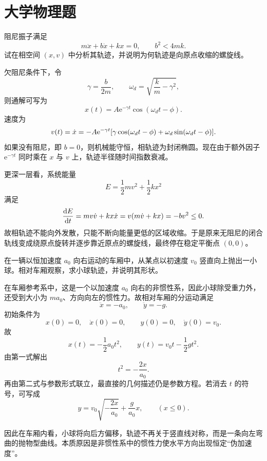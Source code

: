 \section*{大学物理题}

\begin{university}
阻尼振子满足
\[
m\ddot x+b\dot x+kx=0,
\qquad b^2<4mk.
\]
试在相空间 $(x,v)$ 中分析其轨迹，并说明为何轨迹是向原点收缩的螺旋线。

\begin{solution}
欠阻尼条件下，令
\[
\gamma=\frac{b}{2m},
\qquad
\omega_d=\sqrt{\frac{k}{m}-\gamma^2},
\]
则通解可写为
\[
x(t)=A\mathrm e^{-\gamma t}\cos(\omega_d t-\phi).
\]
速度为
\[
v(t)=\dot x=-A\mathrm e^{-\gamma t}\qty[\gamma\cos(\omega_d t-\phi)+\omega_d\sin(\omega_d t-\phi)].
\]
如果没有阻尼，即 $b=0$，则机械能守恒，相轨迹为封闭椭圆。现在由于额外因子 $\mathrm e^{-\gamma t}$ 同时乘在 $x$ 与 $v$ 上，轨迹半径随时间指数衰减。

更深一层看，系统能量
\[
E=\frac12 mv^2+\frac12 kx^2
\]
满足
\[
\dv{E}{t}=mv\dot v+kx\dot x=v(m\dot v+kx)=-bv^2\le 0.
\]
故相轨迹不能向外发散，只能不断向能量更低的区域收缩。于是原来无阻尼的闭合轨线变成绕原点旋转并逐步靠近原点的螺旋线，最终停在稳定平衡点 $(0,0)$。
\end{solution}
\end{university}

\begin{university}
在一辆以恒加速度 $a_0$ 向右运动的车厢中，从某点以初速度 $v_0$ 竖直向上抛出一小球。相对车厢观察，求小球轨迹，并说明其形状。

\begin{solution}
在车厢参考系中，这是一个以加速度 $a_0$ 向右的非惯性系，因此小球除受重力外，还受到大小为 $ma_0$、方向向左的惯性力。故相对车厢的分运动满足
\[
\ddot x=-a_0,
\qquad
\ddot y=-g.
\]
初始条件为
\[
x(0)=0,\quad \dot x(0)=0,
\qquad
y(0)=0,\quad \dot y(0)=v_0.
\]
故
\[
x(t)=-\frac12 a_0 t^2,
\qquad
y(t)=v_0 t-\frac12 gt^2.
\]
由第一式解出
\[
t^2=-\frac{2x}{a_0}.
\]
再由第二式与参数形式联立，最直接的几何描述仍是参数方程。若消去 $t$ 的符号，可写成
\[
y=v_0\sqrt{-\frac{2x}{a_0}}+\frac{g}{a_0}x,
\qquad (x\le 0).
\]

因此在车厢内看，小球将向后方偏移，轨迹不再关于竖直线对称，而是一条向左弯曲的抛物型曲线。本质原因是非惯性系中的惯性力使水平方向出现恒定“伪加速度”。
\end{solution}
\end{university}

